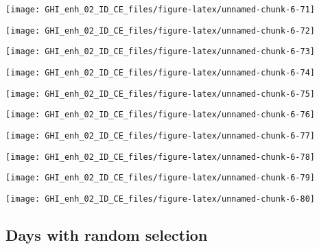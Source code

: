 \documentclass[
  10pt,
  a4paper,oneside]{article}
\begin{document}
\begin{center}\texttt{[image: GHI\_enh\_02\_ID\_CE\_files/figure-latex/unnamed-chunk-6-71]} \end{center}

\begin{center}\texttt{[image: GHI\_enh\_02\_ID\_CE\_files/figure-latex/unnamed-chunk-6-72]} \end{center}

\begin{center}\texttt{[image: GHI\_enh\_02\_ID\_CE\_files/figure-latex/unnamed-chunk-6-73]} \end{center}

\begin{center}\texttt{[image: GHI\_enh\_02\_ID\_CE\_files/figure-latex/unnamed-chunk-6-74]} \end{center}

\begin{center}\texttt{[image: GHI\_enh\_02\_ID\_CE\_files/figure-latex/unnamed-chunk-6-75]} \end{center}

\begin{center}\texttt{[image: GHI\_enh\_02\_ID\_CE\_files/figure-latex/unnamed-chunk-6-76]} \end{center}

\begin{center}\texttt{[image: GHI\_enh\_02\_ID\_CE\_files/figure-latex/unnamed-chunk-6-77]} \end{center}

\begin{center}\texttt{[image: GHI\_enh\_02\_ID\_CE\_files/figure-latex/unnamed-chunk-6-78]} \end{center}

\begin{center}\texttt{[image: GHI\_enh\_02\_ID\_CE\_files/figure-latex/unnamed-chunk-6-79]} \end{center}

\begin{center}\texttt{[image: GHI\_enh\_02\_ID\_CE\_files/figure-latex/unnamed-chunk-6-80]} \end{center}

\hypertarget{days-with-random-selection}{%
\subsection{Days with random selection}\label{days-with-random-selection}}
\end{document}
